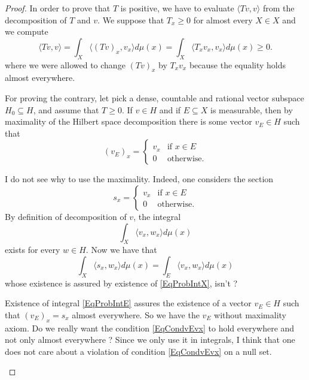 \begin{proof}
	In order to prove that $T$ is positive, we have to evaluate $\langle Tv, v\rangle $ from the decomposition of $T$ and $v$. We suppose that $T_x\geq 0$ for almost every $X\in X$ and we compute
	\begin{equation}
		\langle Tv, v\rangle =\int_X\langle (Tv)_x, v_x\rangle d\mu(x)=\int_X\langle T_xv_x, v_x\rangle d\mu(x)\geq 0.
	\end{equation}
	where we were allowed to change $(Tv)_x$ by $T_xv_x$ because the equality holds almost everywhere.

	For proving the contrary, let pick a dense, countable and rational vector subspace $H_0\subseteq H$, and assume that $T\geq 0$. If $v\in H$ and if $E\subseteq X$ is measurable, then by maximality of the Hilbert space decomposition there is some vector $v_E\in H$ such that
	\begin{equation}		\label{EqCondvEvx}
		(v_E)_x=
	\begin{cases}
		v_x&\text{if $x\in E$}\\
		0&\text{otherwise.}
	\end{cases}
	\end{equation}

	\begin{probleme}		\label{ProbMaximvE}
	I do not see why to use the maximality. Indeed, one considers the section 
	\begin{equation}		
		s_x=
	\begin{cases}
		v_x&\text{if $x\in E$}\\
		0&\text{otherwise.}
	\end{cases}
	\end{equation}
	By definition of decomposition of $v$, the integral
	\begin{equation}		\label{EqProbIntX}
		\int_X\langle v_x, w_x\rangle d\mu(x)
	\end{equation}
	exists for every $w\in H$. Now we have that
	\begin{equation}		\label{EqProbIntE}
		\int_X\langle s_x, w_x\rangle d\mu(x)= \int_E\langle v_x, w_x\rangle d\mu(x)
	\end{equation}
	whose existence is assured by existence of \eqref{EqProbIntX}, isn't ? 

	Existence of integral \eqref{EqProbIntE} assures the existence of a vector $v_E\in H$ such that $(v_E)_x=s_x$ almost everywhere. So we have the $v_E$ without maximality axiom. Do we really want the condition \eqref{EqCondvEvx} to hold everywhere and not only almost everywhere ? Since we only use it in integrals, I think that one does not care about a violation of condition \eqref{EqCondvEvx} on a null set.
	\end{probleme}


\end{proof}

